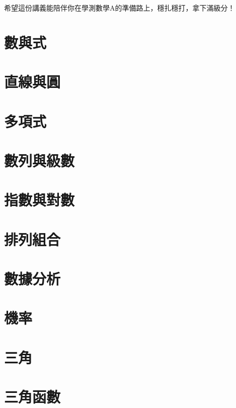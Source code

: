 \documentclass[a4paper,12pt]{report}
\begin{document}
希望這份講義能陪伴你在學測數學A的準備路上，穩扎穩打，拿下滿級分！

\chapter{數與式}


\chapter{直線與圓}


\chapter{多項式}


\chapter{數列與級數}


\chapter{指數與對數}


\chapter{排列組合}


\chapter{數據分析}




\chapter{機率}


\chapter{三角}


\chapter{三角函數}

\end{document}
